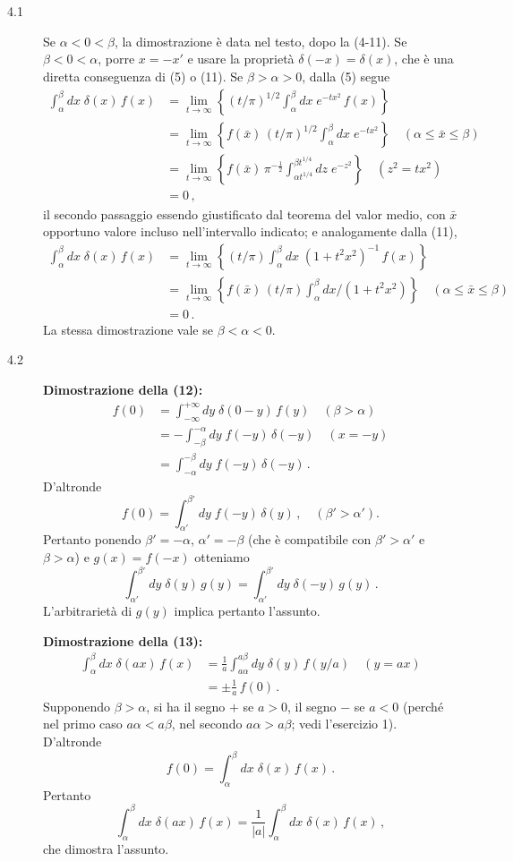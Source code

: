 \documentclass[11pt, a4paper]{book}
\numberwithin{equation}{section}
\begin{document}
\begin{description}
\item[4.1] Se $\alpha<0<\beta$, la dimostrazione è data nel testo, dopo la (4-11). Se $\beta<0<\alpha$, porre $x=-x'$ e usare la proprietà $\delta(-x)=\delta(x)$, che è una diretta conseguenza di (5) o (11). Se $\beta>\alpha>0$, dalla (5) segue
\begin{align*}
  \int_\alpha^\beta dx\;\delta(x)\,f(x)
  &= \lim_{t\to\infty}\left\{(t/\pi)^{1/2}\int_\alpha^\beta dx\;e^{-tx^2}\,f(x)\right\}\\
  &= \lim_{t\to\infty}\left\{f(\bar{x})\,(t/\pi)^{1/2}\int_\alpha^\beta dx\;e^{-tx^2}\right\}
    \quad(\alpha\leq\bar{x}\leq\beta)\\
  &= \lim_{t\to\infty}\left\{f(\bar{x})\,\pi^{-\frac{1}{2}}\int_{\alpha t^{1/4}}^{\beta t^{1/4}} dz\;e^{-z^2}\right\}
    \quad(z^2=tx^2)\\
  &= 0\,,
\end{align*}
il secondo passaggio essendo giustificato dal teorema del valor medio, con $\bar{x}$ opportuno valore incluso nell'intervallo indicato; e analogamente dalla (11),
\begin{align*}
  \int_\alpha^\beta dx\;\delta(x)\,f(x)
  &= \lim_{t\to\infty}\left\{(t/\pi)\int_\alpha^\beta dx\;(1+t^2x^2)^{-1}\,f(x)\right\}\\
  &= \lim_{t\to\infty}\left\{f(\bar{x})\,(t/\pi)\int_\alpha^\beta dx/(1+t^2x^2)\right\}
    \quad(\alpha\leq\bar{x}\leq\beta)\\
  &= 0\,.
\end{align*}
La stessa dimostrazione vale se $\beta<\alpha<0$.

\item[4.2] \textbf{Dimostrazione della (12):}
\begin{align*}
  f(0) &= \int_{-\infty}^{+\infty} dy\;\delta(0-y)\,f(y) \quad (\beta>\alpha)\\
  &= -\int_{-\beta}^{-\alpha} dy\;f(-y)\,\delta(-y) \quad (x=-y)\\
  &= \int_{-\alpha}^{-\beta} dy\;f(-y)\,\delta(-y)\,.
\end{align*}
D'altronde
\[
  f(0) = \int_{\alpha'}^{\beta'} dy\;f(-y)\,\delta(y)\,,\quad(\beta'>\alpha').
\]
Pertanto ponendo $\beta'=-\alpha$, $\alpha'=-\beta$ (che è compatibile con $\beta'>\alpha'$ e $\beta>\alpha$) e $g(x)=f(-x)$ otteniamo
\[
  \int_{\alpha'}^{\beta'} dy\;\delta(y)\,g(y) = \int_{\alpha'}^{\beta'} dy\;\delta(-y)\,g(y)\,.
\]
L'arbitrarietà di $g(y)$ implica pertanto l'assunto.

\textbf{Dimostrazione della (13):}
\begin{align*}
  \int_\alpha^\beta dx\;\delta(ax)\,f(x)
  &= \frac{1}{a}\int_{a\alpha}^{a\beta} dy\;\delta(y)\,f(y/a) \quad (y=ax)\\
  &= \pm\frac{1}{a}\,f(0)\,.
\end{align*}
Supponendo $\beta>\alpha$, si ha il segno $+$ se $a>0$, il segno $-$ se $a<0$ (perché nel primo caso $a\alpha<a\beta$, nel secondo $a\alpha>a\beta$; vedi l'esercizio 1). D'altronde
\[
  f(0) = \int_\alpha^\beta dx\;\delta(x)\,f(x)\,.
\]
Pertanto
\[
  \int_\alpha^\beta dx\;\delta(ax)\,f(x) = \frac{1}{|a|}\int_\alpha^\beta dx\;\delta(x)\,f(x)\,,
\]
che dimostra l'assunto.


\end{description}
\end{document}
